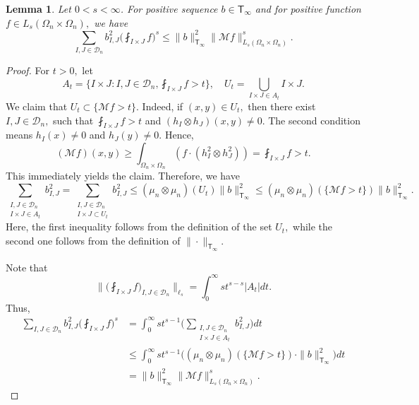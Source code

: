 \documentclass{amsart}
\numberwithin{equation}{section}
\newtheorem{lem}[thm]{Lemma}
\theoremstyle{definition}
\theoremstyle{remark}
\newcommand{\1}{\mathbf 1}
\newcommand{\T}{\mathsf T}
\begin{document}
\begin{lem}\label{carleson lemma}
	Let $0<s<\infty$. For positive sequence $b\in\T_{\infty}$ and for positive function $f\in L_s(\Omega_n\times\Omega_n),$ we have
\begin{equation}\label{eq:layer-cake-carleson}
\sum_{I,J\in\mathcal{D}_n}b_{I,J}^2\Big(\fint_{I\times J}f\Big)^s\leq \|b\|_{\T_{\infty}}^2
 \|\mathcal{M}f\|_{L_s(\Omega_n\times\Omega_n)}^s.
\end{equation}
\end{lem}
\begin{proof} For $t>0,$ let
$$A_t= \{I\times J: I,J\in\mathcal{D}_n, \fint_{I\times J}f>t\},\quad U_t=\bigcup_{I\times J\in A_t} I\times J.$$
We claim that $U_t\subset\{\mathcal{M}f>t\}.$ Indeed, if  $(x,y)\in U_t,$ then there exist $I,J\in\mathcal{D}_n,$ such that $\fint_{I\times J}f>t$ and $(h_I\otimes h_J)(x,y)\neq 0.$ The second condition means $h_I(x)\neq0$ and $h_J(y)\neq 0.$ Hence,
$$(\mathcal{M}f)(x,y)\geq\int_{\Omega_n\times\Omega_n}(f\cdot (h_I^2\otimes h_J^2))=\fint_{I\times J}f>t.$$
This immediately yields the claim.
Therefore, we have
$$\sum_{\substack{I,J\in\mathcal{D}_n\\ I\times J\in A_t}}b_{I,J}^2=\sum_{\substack{I,J\in\mathcal{D}_n\\ I\times J\subset U_t}}b_{I,J}^2\leq (\mu_n\otimes\mu_n)(U_t)\|b\|_{\T_{\infty}}^2\leq (\mu_n\otimes\mu_n)(\{\mathcal{M}f>t\})\|b\|_{\T_{\infty}}^2.$$
Here, the first inequality follows from the definition of the set $U_t,$ while the second one follows from the definition of $\|\cdot\|_{\T_{\infty}}.$


Note that
$$\Big\|\Big(\fint_{I\times J}f\Big)_{I,J\in\mathcal{D}_n}\Big\|_{\ell_s}=\int_0^{\infty}st^{s-s}|A_t|dt.$$
Thus,
\begin{align*}
\sum_{I,J\in\mathcal{D}_n}b_{I,J}^2\Big(\fint_{I\times J}f\Big)^s&=\int_0^{\infty}st^{s-1}\Big(\sum_{\substack{I,J\in\mathcal{D}_n\\ I\times J\in A_t}}b_{I,J}^2\Big)dt\\
&\leq\int_0^{\infty}st^{s-1}\Big((\mu_n\otimes\mu_n)(\{\mathcal{M}f>t\})\cdot \|b\|_{\T_{\infty}}^2\Big)dt\\
&=\|b\|_{\T_{\infty}}^2\|\mathcal{M}f\|_{L_s(\Omega_n\times\Omega_n)}^s.
\end{align*}
\end{proof}
\end{document}
